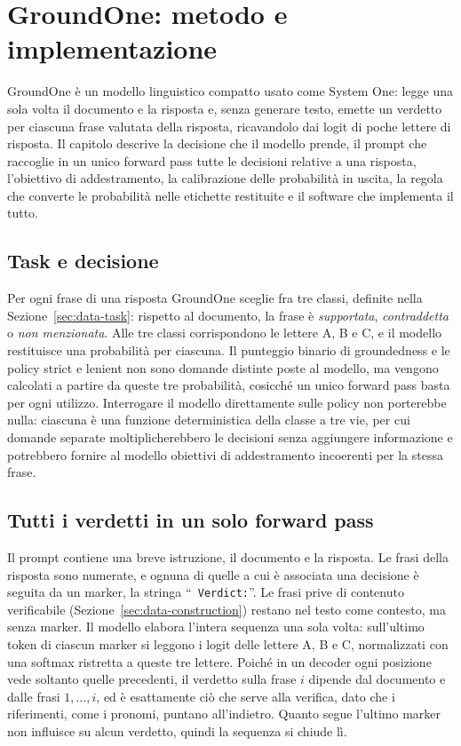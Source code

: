 \chapter{GroundOne: metodo e implementazione}
\label{sec:method}


GroundOne è un modello linguistico compatto usato come System One: legge una sola volta il documento e la risposta e,
senza generare testo, emette un verdetto per ciascuna frase valutata della risposta, ricavandolo dai logit di poche
lettere di risposta. Il capitolo descrive la decisione che il modello prende, il prompt che raccoglie in un unico
forward pass tutte le decisioni relative a una risposta, l'obiettivo di addestramento, la calibrazione delle
probabilità in uscita, la regola che converte le probabilità nelle etichette restituite e il software che implementa il
tutto.

\section{Task e decisione}
\label{sec:method-task}

Per ogni frase di una risposta GroundOne sceglie fra tre classi, definite nella Sezione~\ref{sec:data-task}: rispetto
al documento, la frase è \emph{supportata}, \emph{contraddetta} o \emph{non menzionata}. Alle tre classi corrispondono
le lettere A, B e C, e il modello restituisce una probabilità per ciascuna. Il punteggio binario di groundedness e le
policy strict e lenient non sono domande distinte poste al modello, ma vengono calcolati a partire da queste tre
probabilità, cosicché un unico forward pass basta per ogni utilizzo. Interrogare il modello direttamente sulle policy
non porterebbe nulla: ciascuna è una funzione deterministica della classe a tre vie, per cui domande separate
moltiplicherebbero le decisioni senza aggiungere informazione e potrebbero fornire al modello obiettivi di
addestramento incoerenti per la stessa frase.

\section{Tutti i verdetti in un solo forward pass}
\label{sec:method-readout}

Il prompt contiene una breve istruzione, il documento e la risposta. Le frasi della risposta sono numerate, e ognuna di
quelle a cui è associata una decisione è seguita da un marker, la stringa ``\texttt{~Verdict:}''. Le frasi prive di
contenuto verificabile (Sezione~\ref{sec:data-construction}) restano nel testo come contesto, ma senza marker. Il
modello elabora l'intera sequenza una sola volta: sull'ultimo token di ciascun marker si leggono i logit delle lettere
A, B e C, normalizzati con una softmax ristretta a queste tre lettere. Poiché in un decoder ogni posizione vede
soltanto quelle precedenti, il verdetto sulla frase $i$ dipende dal documento e dalle frasi $1, \dots, i$, ed è
esattamente ciò che serve alla verifica, dato che i riferimenti, come i pronomi, puntano all'indietro. Quanto segue
l'ultimo marker non influisce su alcun verdetto, quindi la sequenza si chiude lì.

